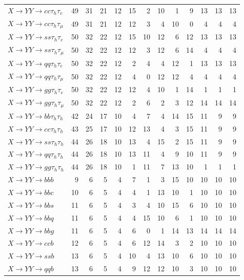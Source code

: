 {\begin{longtable}{l rrrrrrrrrrrr}
$X\to YY\to cc\tau_h\tau_e$ & 49 & 31 & 21 & 12 & 15 & 2 & 10 & 1 & 9 & 13 & 13 & 13 \\
$X\to YY\to cc\tau_h\tau_\mu$ & 49 & 31 & 21 & 12 & 12 & 3 & 4 & 10 & 0 & 4 & 4 & 4 \\
$X\to YY\to ss\tau_h\tau_e$ & 50 & 32 & 22 & 12 & 15 & 10 & 12 & 6 & 12 & 13 & 13 & 13 \\
$X\to YY\to ss\tau_h\tau_\mu$ & 50 & 32 & 22 & 12 & 12 & 3 & 12 & 6 & 14 & 4 & 4 & 4 \\
$X\to YY\to qq\tau_h\tau_e$ & 50 & 32 & 22 & 12 & 2 & 4 & 4 & 12 & 1 & 13 & 13 & 13 \\
$X\to YY\to qq\tau_h\tau_\mu$ & 50 & 32 & 22 & 12 & 4 & 0 & 12 & 12 & 4 & 4 & 4 & 4 \\
$X\to YY\to gg\tau_h\tau_e$ & 50 & 32 & 22 & 12 & 12 & 4 & 10 & 1 & 14 & 1 & 1 & 1 \\
$X\to YY\to gg\tau_h\tau_\mu$ & 50 & 32 & 22 & 12 & 2 & 6 & 2 & 3 & 12 & 14 & 14 & 14 \\
\addlinespace[2pt]
$X\to YY\to bb\tau_h\tau_h$ & 42 & 24 & 17 & 10 & 4 & 7 & 4 & 14 & 15 & 11 & 9 & 9 \\
$X\to YY\to cc\tau_h\tau_h$ & 43 & 25 & 17 & 10 & 12 & 13 & 4 & 3 & 15 & 11 & 9 & 9 \\
$X\to YY\to ss\tau_h\tau_h$ & 44 & 26 & 18 & 10 & 13 & 4 & 15 & 2 & 15 & 11 & 9 & 9 \\
$X\to YY\to qq\tau_h\tau_h$ & 44 & 26 & 18 & 10 & 13 & 11 & 4 & 9 & 10 & 11 & 9 & 9 \\
$X\to YY\to gg\tau_h\tau_h$ & 44 & 26 & 18 & 10 & 1 & 11 & 7 & 13 & 10 & 1 & 1 & 1 \\
\addlinespace[2pt]
$X\to YY\to bbb$ & 9 & 6 & 5 & 4 & 7 & 1 & 3 & 15 & 10 & 10 & 10 & 10 \\
$X\to YY\to bbc$ & 10 & 6 & 5 & 4 & 4 & 1 & 13 & 10 & 1 & 10 & 10 & 10 \\
$X\to YY\to bbs$ & 11 & 6 & 5 & 4 & 3 & 4 & 10 & 15 & 6 & 10 & 10 & 10 \\
$X\to YY\to bbq$ & 11 & 6 & 5 & 4 & 4 & 15 & 10 & 6 & 1 & 10 & 10 & 10 \\
$X\to YY\to bbg$ & 11 & 6 & 5 & 4 & 6 & 0 & 1 & 14 & 13 & 14 & 14 & 14 \\
$X\to YY\to ccb$ & 12 & 6 & 5 & 4 & 6 & 12 & 14 & 3 & 2 & 10 & 10 & 10 \\
$X\to YY\to ssb$ & 13 & 6 & 5 & 4 & 10 & 4 & 13 & 10 & 6 & 10 & 10 & 10 \\
$X\to YY\to qqb$ & 13 & 6 & 5 & 4 & 9 & 12 & 12 & 10 & 3 & 10 & 10 & 10 \\

\end{longtable}}
